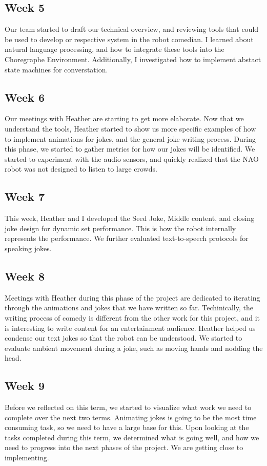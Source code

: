 \documentclass[onecolumn, draftclsnofoot,10pt, compsoc]{IEEEtran}
\begin{document}
\subsection{Week 5}
	Our team started to draft our technical overview, and reviewing tools that could be used to develop or respective system in the robot comedian. I learned about natural language processing, and how to integrate these tools into the Choregraphe Environment. Additionally, I investigated how to implement abstact state machines for converstation.
\subsection{Week 6}
	Our meetings with Heather are starting to get more elaborate. Now that we understand the tools, Heather started to show us more specific examples of how to implement animations for jokes, and the general joke writing process. During this phase, we started to gather metrics for how our jokes will be identified. We started to experiment with the audio sensors, and quickly realized that the NAO robot was not designed to listen to large crowds.
\subsection{Week 7}
	This week, Heather and I developed the Seed Joke, Middle content, and closing joke design for dynamic set performance. This is how the robot internally represents the performance. We further evaluated text-to-speech protocols for speaking jokes.
\subsection{Week 8}
	Meetings with Heather during this phase of the project are dedicated to iterating through the animations and jokes that we have written so far. Techinically, the writing process of comedy is different from the other work for this project, and it is interesting to write content for an entertainment audience. Heather helped us condense our text jokes so that the robot can be understood. We started to evaluate ambient movement during a joke, such as moving hands and nodding the head.
\subsection{Week 9}
	Before we reflected on this term, we started to visualize what work we need to complete over the next two terms. Animating jokes is going to be the most time consuming task, so we need to have a large base for this. Upon looking at the tasks completed during this term, we determined what is going well, and how we need to progress into the next phases of the project. We are getting close to implementing.
\end{document}
